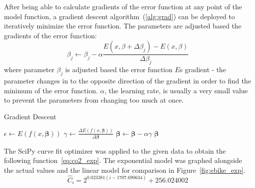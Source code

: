 After being able to calculate gradients of the error function at any point of the model function, a gradient descent algorithm~(\ref{alg:grad}) can be deployed to iteratively minimize the error function.
The parameters are adjusted based the gradients of the error function:
%
\begin{equation}
    \beta_j \longleftarrow \beta_j - \alpha \frac{E(x, \beta + \Delta \beta_j) - E(x, \beta)}{\Delta \beta_j}
\end{equation}
%
\noindent where parameter $\beta_j$ is adjusted based the error function $E$\textquotesingle s gradient - the parameter changes in to the opposite direction of the gradient in order to find the minimum of the error function.
$\alpha$, the learning rate, is usually a very small value to prevent the parameters from changing too much at once.

\begin{algorithm}
    \caption{Gradient Descent}
    \label{alg:grad}
    \begin{algorithmic}
        \Repeat
            \State $\epsilon \gets E(f(x, \mathbf{\beta}))$  
            \State $\gamma \gets \frac{\Delta E(f(x, \mathbf{\beta}))}{\Delta \mathbf{\beta}}$  
            \State $\mathbf{\beta} \gets \mathbf{\beta} - \alpha \gamma$  
          
        \State \Return $\mathbf{\beta}$ 
    \end{algorithmic}
\end{algorithm}


The SciPy curve fit optimizer was applied to the given data to obtain the following function~\ref{eq:co2_exp}.
The exponential model was graphed alongside the actual values and the linear model for comparison in Figure~\ref{fig:ebike_exp}.
%
\begin{equation}
    \hat C_i = 2^{0.023381 (i - 1707.690634)} + 256.024002
    \label{eq:co2_exp}
\end{equation}

